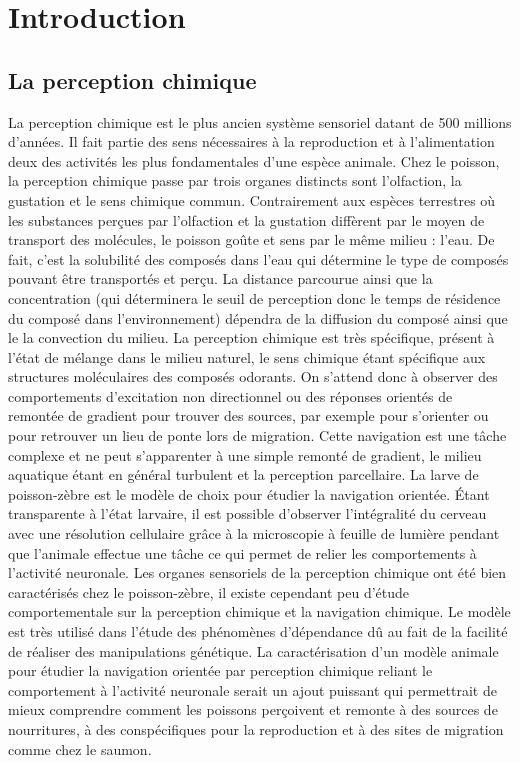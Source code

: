\chapter{Introduction}

  \section{La perception chimique}
  La perception chimique est le plus ancien système sensoriel datant de 500 millions d'années. Il fait partie des sens nécessaires à la reproduction et à l'alimentation deux des activités les plus fondamentales d'une espèce animale. Chez le poisson, la perception chimique passe par trois organes distincts sont l'olfaction, la gustation et le sens chimique commun. Contrairement aux espèces terrestres où les substances perçues par l'olfaction et la gustation diffèrent par le moyen de transport des molécules, le poisson goûte et sens par le même milieu : l'eau. De fait, c'est la solubilité des composés dans l'eau qui détermine le type de composés pouvant être transportés et perçu. La distance parcourue ainsi que la concentration (qui déterminera le seuil de perception donc le temps de résidence du composé dans l'environnement) dépendra de la diffusion du composé ainsi que le la convection du milieu. La perception chimique est très spécifique, présent à l'état de mélange dans le milieu naturel, le sens chimique étant spécifique aux structures moléculaires des composés odorants. On s'attend donc à observer des comportements d'excitation non directionnel ou des réponses orientés de remontée de gradient pour trouver des sources, par exemple pour s'orienter ou pour retrouver un lieu de ponte lors de migration. Cette navigation est une tâche complexe et ne peut s'apparenter à une simple remonté de gradient, le milieu aquatique étant en général turbulent et la perception parcellaire.
  \medbreak
  La larve de poisson-zèbre est le modèle de choix pour étudier la navigation orientée. Étant transparente à l'état larvaire, il est possible d'observer l'intégralité du cerveau avec une résolution cellulaire grâce à la microscopie à feuille de lumière pendant que l'animale effectue une tâche ce qui permet de relier les comportements à l'activité neuronale. Les organes sensoriels de la perception chimique ont été bien caractérisés chez le poisson-zèbre, il existe cependant peu d'étude comportementale sur la perception chimique et la navigation chimique. Le modèle est très utilisé dans l'étude des phénomènes d'dépendance dû au fait de la facilité de réaliser des manipulations génétique. La caractérisation d'un modèle animale pour étudier la navigation orientée par perception chimique reliant le comportement à l'activité neuronale serait un ajout puissant qui permettrait de mieux comprendre comment les poissons perçoivent et remonte à des sources de nourritures, à des conspécifiques pour la reproduction et à des sites de migration comme chez le saumon.

